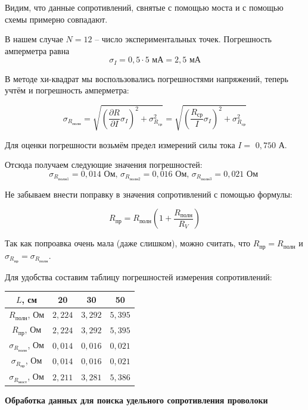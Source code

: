 \documentclass[a4paper, 12pt]{article} %
\begin{document}
Видим, что данные сопротивлений, свнятые с помощью моста и с помощью схемы примерно совпадают.

В нашем случае $N = 12$ -- число экспериментальных точек. Погрешность амперметра равна
\[\sigma_I = 0,5 \cdot 5 \text{ мА} = 2,5 \text{ мА}\]

В методе хи-квадрат мы воспользовались погрешностями напряжений, теперь учтём и погрешность амперметра:

\[\sigma_{R_{\text{полн}}} = \sqrt{ \left(\frac{\partial R}{\partial I} \sigma_I\right)^2 + \sigma_{R_{\text{ср}}}^2} = \sqrt{ \left(\frac{R_{\text{ср}}}{I} \sigma_I\right)^2 + \sigma_{R_{\text{ср}}}^2}\]

Для оценки погрешности возьмём предел измерений силы тока $I =$ $0,750$ А.

Отсюда получаем следующие значения погрешностей:
\[\sigma_{R_{\text{полн}1}} = 0,014 \text{ Ом, }\sigma_{R_{\text{полн}2}} = 0,016\text{ Ом, }\sigma_{R_{\text{полн}3}} = 0,021\text{ Ом }\]

Не забываем внести поправку в значения сопротивлений с помощью формулы:

\[R_{\text{пр}} = R_{\text{полн}} (1 + \frac{R_{\text{полн}}}{R_V})\]

Так как попроавка очень мала (даже слишком), можно считать, что $R_{\text{пр}} = R_{\text{полн}}$ и $\sigma_{R_{\text{пр}}} = \sigma_{R_{\text{полн}}}$.

Для удобства составим таблицу погрешностей измерения сопротивлений:
\begin{center}
\begin{tabular}{|c|c|c|c|}
\hline 
$L$, см & 20 & 30 & 50 \\ 
\hline 
$R_{\text{полн}}$, Ом & $2,224$ & $3,292$ & $5,395$ \\ 
\hline 
$R_{\text{пр}}$, Ом & $2,224$ & $3,292$ & $5,395$ \\ 
\hline 
$\sigma_{R_{\text{полн}}}$, Ом & $0,014$ & $0,016$ & $0,021$ \\ 
\hline 
$\sigma_{R_{\text{пр}}}$, Ом & $0,014$ & $0,016$ & $0,021$ \\ 
\hline 
$\sigma_{R_{\text{мост}}}$, Ом & $2,211$ & $3,281$ & $5,386$ \\ 
\hline  
\end{tabular} 
\end{center}
\newpage
\begin{center}
 \textbf{Обработка данных для поиска удельного сопротивления проволоки}
\end{center}
\end{document}
